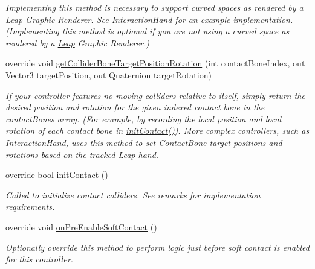 \begin{DoxyCompactItemize}
\begin{DoxyCompactList}\small\item\em Implementing this method is necessary to support curved spaces as rendered by a \mbox{\hyperlink{namespace_leap_1_1_unity_1_1_leap}{Leap}} Graphic Renderer. See \mbox{\hyperlink{class_leap_1_1_unity_1_1_interaction_1_1_interaction_hand}{Interaction\+Hand}} for an example implementation. (Implementing this method is optional if you are not using a curved space as rendered by a \mbox{\hyperlink{namespace_leap_1_1_unity_1_1_leap}{Leap}} Graphic Renderer.) \end{DoxyCompactList}\item 
override void \mbox{\hyperlink{class_leap_1_1_unity_1_1_interaction_1_1_interaction_hand_a760d127098bcd961aa2ede7c279faa9c}{get\+Collider\+Bone\+Target\+Position\+Rotation}} (int contact\+Bone\+Index, out Vector3 target\+Position, out Quaternion target\+Rotation)
\begin{DoxyCompactList}\small\item\em If your controller features no moving colliders relative to itself, simply return the desired position and rotation for the given indexed contact bone in the contact\+Bones array. (For example, by recording the local position and local rotation of each contact bone in \mbox{\hyperlink{class_leap_1_1_unity_1_1_interaction_1_1_interaction_hand_a01581c96fd67f53a9b8a6ddc36e0709c}{init\+Contact()}}). More complex controllers, such as \mbox{\hyperlink{class_leap_1_1_unity_1_1_interaction_1_1_interaction_hand}{Interaction\+Hand}}, uses this method to set \mbox{\hyperlink{class_leap_1_1_unity_1_1_interaction_1_1_contact_bone}{Contact\+Bone}} target positions and rotations based on the tracked \mbox{\hyperlink{namespace_leap_1_1_unity_1_1_leap}{Leap}} hand. \end{DoxyCompactList}\item 
override bool \mbox{\hyperlink{class_leap_1_1_unity_1_1_interaction_1_1_interaction_hand_a01581c96fd67f53a9b8a6ddc36e0709c}{init\+Contact}} ()
\begin{DoxyCompactList}\small\item\em Called to initialize contact colliders. See remarks for implementation requirements. \end{DoxyCompactList}\item 
override void \mbox{\hyperlink{class_leap_1_1_unity_1_1_interaction_1_1_interaction_hand_a5fe00b0f12a6e91eecdf6472b2fa0775}{on\+Pre\+Enable\+Soft\+Contact}} ()
\begin{DoxyCompactList}\small\item\em Optionally override this method to perform logic just before soft contact is enabled for this controller. \end{DoxyCompactList}\item 

\end{DoxyCompactItemize}
